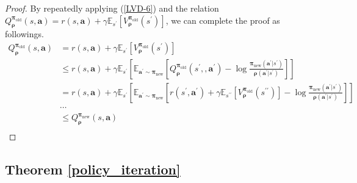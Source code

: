\documentclass{article}
\begin{document}
\begin{proof}
		By repeatedly applying (\ref{LVD-6}) and the relation $	Q^{\bm{\pi}_{\operatorname{old}}}_{\bm{\rho}}(s,\bm{a})  = r(s,\bm{a}) + \gamma\mathbb{E}_{s^\prime} \left[ V^{\bm{\pi}_{\operatorname{old}}}_{\bm{\rho}}(s^\prime)  \right] $, we can complete the proof as followings.
		\[
		\begin{split}
			Q^{\bm{\pi}_{\operatorname{old}}}_{\bm{\rho}}(s,\bm{a}) & = r(s,\bm{a}) + \gamma \mathbb{E}_{s^\prime} \left[ V^{\bm{\pi}_{\operatorname{old}}}_{\bm{\rho}}(s^\prime)  \right] \\
			& \le r(s,\bm{a}) + \gamma\mathbb{E}_{s^\prime} \left[  \mathbb{E}_{\bm{a}^\prime \sim \bm{\pi}_{\operatorname{new}} } \left[ Q^{\bm{\pi}_{\operatorname{old}}}_{\bm{\rho}}(s^\prime,,\bm{a}^\prime) -  \log \frac{{\bm{\pi}_{\operatorname{new}}}(\bm{a}^\prime|s^\prime)}{{\bm{\rho}}(\bm{a^\prime}|s^\prime)} \right] \right] \\ 
			& = r(s,\bm{a}) + \gamma \mathbb{E}_{s^\prime} \left[  \mathbb{E}_{\bm{a}^\prime \sim \bm{\pi}_{\operatorname{new}} } \left[ r(s^\prime,\bm{a}^\prime) + \gamma \mathbb{E}_{s^{\prime\prime}} \left[ V^{\bm{\pi}_{\operatorname{old}}}_{\bm{\rho}}(s^{\prime\prime})  \right]  -  \log \frac{{\bm{\pi}_{\operatorname{new}}}(\bm{a}^\prime|s^\prime)}{{\bm{\rho}}(\bm{a}^\prime|s^\prime)} \right] \right] \\
			& \cdots \\
			& \le Q^{\bm{\pi}_{\operatorname{new}}}_{\bm{\rho}}(s,\bm{a}) \\
		\end{split}
		\]
	\end{proof}
	
	
	
	\subsection{Theorem \ref{policy_iteration}}
	\label{sec:app-iter}
	
\end{document}
